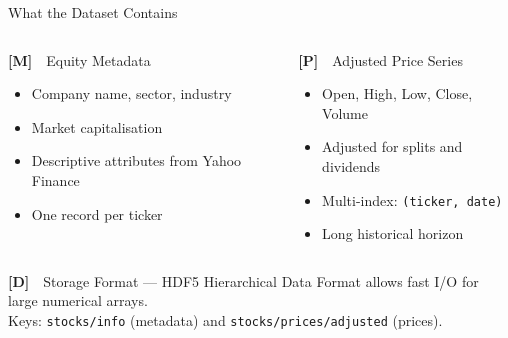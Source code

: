 \documentclass[aspectratio=169]{beamer}
\begin{document}
%
%
\begin{frame}{What the Dataset Contains}

\begin{columns}[T]
\begin{block}{\textbf{[M]}\ \ Equity Metadata}
\begin{itemize}
  \item Company name, sector, industry
  \item Market capitalisation
  \item Descriptive attributes from Yahoo Finance
  \item One record per ticker
\end{itemize}
\end{block}

\begin{block}{\textbf{[P]}\ \ Adjusted Price Series}
\begin{itemize}
  \item Open, High, Low, Close, Volume
  \item Adjusted for splits and dividends
  \item Multi-index: \texttt{(ticker, date)}
  \item Long historical horizon
\end{itemize}
\end{block}
\end{columns}

\vspace{0.6cm}

\begin{block}{\textbf{[D]}\ \ Storage Format --- HDF5}
Hierarchical Data Format allows fast I/O for large numerical arrays. \\
Keys: \texttt{stocks/info} (metadata) and \texttt{stocks/prices/adjusted} (prices).
\end{block}

\end{frame}
%
%
\end{document}
